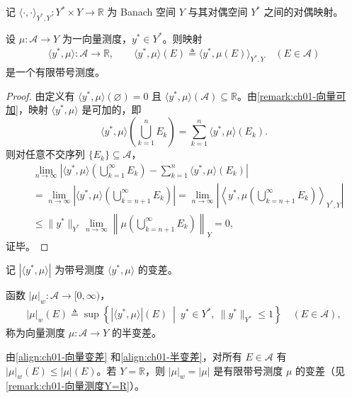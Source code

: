 \documentclass[../../main.tex]{subfiles}%
\begin{document}
记 $\langle\cdot,\cdot\rangle_{Y^*,Y}:Y^*\times Y\to\mathbb{R}$ 为 Banach 空间 $Y$ 与其对偶空间 $Y^*$ 之间的对偶映射。

\begin{proposition}\label{proposition:ch01-向量标量化}
设 $\mu:\mathcal{A}\to Y$ 为一向量测度，$y^*\in Y^*$。则映射
\begin{align}
\langle y^*,\mu\rangle:\mathcal{A}\to\mathbb{R},\qquad
\langle y^*,\mu\rangle(E)\triangleq \langle y^*,\mu(E)\rangle_{Y^*,Y}\quad(E\in\mathcal{A}) \label{align:ch01-标量化}
\end{align}
是一个有限带号测度。
\end{proposition}

\begin{proof}
由定义有 $\langle y^*,\mu\rangle(\varnothing )=0$ 且 $\langle y^*,\mu\rangle(\mathcal{A})\subseteq\mathbb{R}$。由\cref{remark:ch01-向量可加}，映射 $\langle y^*,\mu\rangle$ 是可加的，即
\[
\langle y^*,\mu\rangle\left(\bigcup_{k=1}^n E_k\right)=\sum_{k=1}^n\langle y^*,\mu\rangle(E_k).
\]
则对任意不交序列 $\{E_k\}\subseteq\mathcal{A}$，
\[
\begin{aligned}
&\lim_{n\to\infty}\left|\langle y^*,\mu\rangle\left(\bigcup_{k=1}^\infty E_k\right)-\sum_{k=1}^n\langle y^*,\mu\rangle(E_k)\right|\\
&=\lim_{n\to\infty}\left|\langle y^*,\mu\rangle\left(\bigcup_{k=n+1}^\infty E_k\right)\right|
=\lim_{n\to\infty}\left|\left\langle y^*,\mu\left(\bigcup_{k=n+1}^\infty E_k\right)\right\rangle_{Y^*,Y}\right|\\
&\leqslant\|y^*\|_{Y^*}\lim_{n\to\infty}\left\|\mu\left(\bigcup_{k=n+1}^\infty E_k\right)\right\|_Y=0,
\end{aligned}
\]
证毕。
\end{proof}

记 $|\langle y^*,\mu\rangle|$ 为带号测度 $\langle y^*,\mu\rangle$ 的变差。

\begin{definition}\label{definition:ch01-半变差}
函数 $|\mu|_w:\mathcal{A}\to[0,\infty)$，
\begin{align}
|\mu|_w(E)\triangleq \sup\left\{|\langle y^*,\mu\rangle|(E)\ \middle|\ y^*\in Y^*,\ \|y^*\|_{Y^*}\leqslant 1\right\}\quad(E\in\mathcal{A}), \label{align:ch01-半变差}
\end{align}
称为向量测度 $\mu:\mathcal{A}\to Y$ 的半变差。
\end{definition}

\begin{remark}\label{remark:ch01-半变差性质}
由\eqref{align:ch01-向量变差} 和\eqref{align:ch01-半变差}，对所有 $E\in\mathcal{A}$ 有 $|\mu|_w(E)\leqslant|\mu|(E)$。若 $Y=\mathbb{R}$，则 $|\mu|_w=|\mu|$ 是有限带号测度 $\mu$ 的变差（见\cref{remark:ch01-向量测度Y=R}）。
\end{remark}
\end{document}
